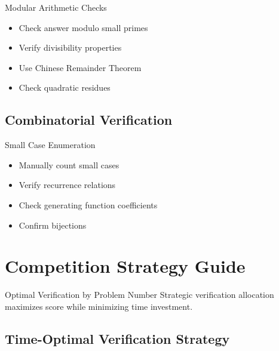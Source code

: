 \documentclass{article}
\begin{document}
\begin{specializedbox}{Modular Arithmetic Checks}
\begin{itemize}
\item Check answer modulo small primes
\item Verify divisibility properties
\item Use Chinese Remainder Theorem
\item Check quadratic residues
\end{itemize}
\end{specializedbox}

\subsection{Combinatorial Verification}

\begin{specializedbox}{Small Case Enumeration}
\begin{itemize}
\item Manually count small cases
\item Verify recurrence relations
\item Check generating function coefficients
\item Confirm bijections
\end{itemize}
\end{specializedbox}

\newpage

\section{Competition Strategy Guide}

\begin{strategybox}{Optimal Verification by Problem Number}
Strategic verification allocation maximizes score while minimizing time investment.
\end{strategybox}

\subsection{Time-Optimal Verification Strategy}
\end{document}
